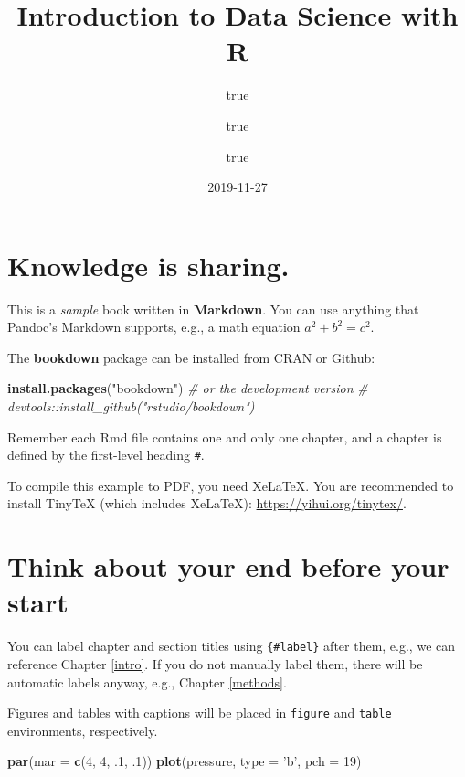 \documentclass[]{book}
\title{Introduction to Data Science with R}
\author{true \and true \and true}
\date{2019-11-27}
\newenvironment{Shaded}{\begin{snugshade}}{\end{snugshade}}
\newcommand{\CommentTok}[1]{\textcolor[rgb]{0.56,0.35,0.01}{\textit{#1}}}
\newcommand{\DataTypeTok}[1]{\textcolor[rgb]{0.13,0.29,0.53}{#1}}
\newcommand{\DecValTok}[1]{\textcolor[rgb]{0.00,0.00,0.81}{#1}}
\newcommand{\FloatTok}[1]{\textcolor[rgb]{0.00,0.00,0.81}{#1}}
\newcommand{\KeywordTok}[1]{\textcolor[rgb]{0.13,0.29,0.53}{\textbf{#1}}}
\newcommand{\NormalTok}[1]{#1}
\newcommand{\StringTok}[1]{\textcolor[rgb]{0.31,0.60,0.02}{#1}}
\begin{document}
\maketitle

{
\setcounter{tocdepth}{1}
\tableofcontents
}
\hypertarget{knowledge-is-sharing.}{%
\chapter{Knowledge is sharing.}\label{knowledge-is-sharing.}}

This is a \emph{sample} book written in \textbf{Markdown}. You can use anything that Pandoc's Markdown supports, e.g., a math equation \(a^2 + b^2 = c^2\).

The \textbf{bookdown} package can be installed from CRAN or Github:

\begin{Shaded}
\begin{Highlighting}[]
\KeywordTok{install.packages}\NormalTok{(}\StringTok{"bookdown"}\NormalTok{)}
\CommentTok{# or the development version}
\CommentTok{# devtools::install_github("rstudio/bookdown")}
\end{Highlighting}
\end{Shaded}

Remember each Rmd file contains one and only one chapter, and a chapter is defined by the first-level heading \texttt{\#}.

To compile this example to PDF, you need XeLaTeX. You are recommended to install TinyTeX (which includes XeLaTeX): \url{https://yihui.org/tinytex/}.

\hypertarget{think-about-your-end-before-your-start}{%
\chapter{Think about your end before your start}\label{think-about-your-end-before-your-start}}

You can label chapter and section titles using \texttt{\{\#label\}} after them, e.g., we can reference Chapter \ref{intro}. If you do not manually label them, there will be automatic labels anyway, e.g., Chapter \ref{methods}.

Figures and tables with captions will be placed in \texttt{figure} and \texttt{table} environments, respectively.

\begin{Shaded}
\begin{Highlighting}[]
\KeywordTok{par}\NormalTok{(}\DataTypeTok{mar =} \KeywordTok{c}\NormalTok{(}\DecValTok{4}\NormalTok{, }\DecValTok{4}\NormalTok{, }\FloatTok{.1}\NormalTok{, }\FloatTok{.1}\NormalTok{))}
\KeywordTok{plot}\NormalTok{(pressure, }\DataTypeTok{type =} \StringTok{'b'}\NormalTok{, }\DataTypeTok{pch =} \DecValTok{19}\NormalTok{)}
\end{Highlighting}
\end{Shaded}
\end{document}
